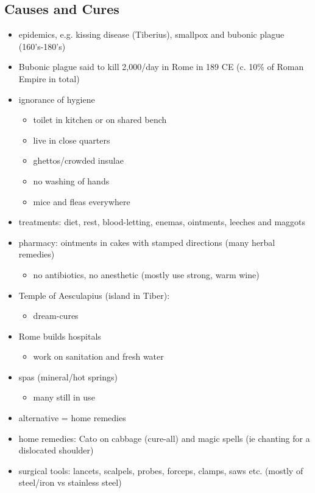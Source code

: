 \documentclass[12pt, twoside]{article}
\begin{document}
\subsection{Causes and Cures}
\begin{itemize}
\item epidemics, e.g. kissing disease (Tiberius), smallpox and bubonic plague (160's-180's)
\item Bubonic plague said to kill 2,000/day in Rome in 189 CE (c. 10\% of Roman Empire in total)
\item ignorance of hygiene
	\begin{itemize}
	\item toilet in kitchen or on shared bench
	\item live in close quarters
	\item ghettos/crowded insulae
	\item no washing of hands
	\item mice and fleas everywhere
	\end{itemize}
\item treatments: diet, rest, blood-letting, enemas, ointments, leeches and maggots
\item pharmacy: ointments in cakes with stamped directions (many herbal remedies)	
	\begin{itemize}
	\item no antibiotics, no 	anesthetic (mostly 	use strong, warm wine)
	\end{itemize}
\item Temple of Aesculapius (island in Tiber): 
	\begin{itemize}
	\item dream-cures
	\end{itemize}
\item Rome builds hospitals
	\begin{itemize}
	\item work on sanitation and fresh water
	\end{itemize}
\item spas (mineral/hot springs)
	\begin{itemize}
	\item many still in use
	\end{itemize}
\item alternative = home remedies
\item home remedies: Cato on cabbage (cure-all) and magic spells (ie chanting for a dislocated shoulder)
\item surgical tools: lancets, scalpels, probes, forceps, clamps, saws etc. (mostly of steel/iron vs stainless steel)
\end{itemize}
\end{document}
